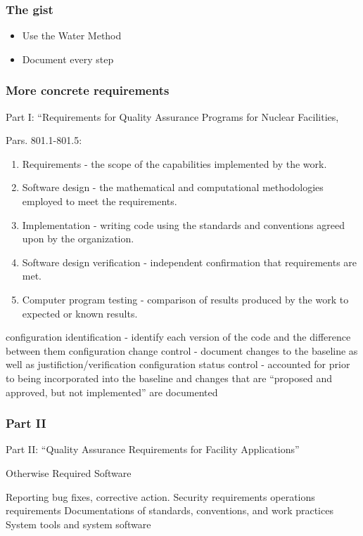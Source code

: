 \documentclass[12pt]{beamer}
\begin{document}
\begin{frame}
\frametitle{The gist}

\begin{itemize}
\item{Use the Water Method}
\item{Document every step}
\end{itemize}

\end{frame}

\begin{frame}
\frametitle{More concrete requirements}

Part I: “Requirements for Quality Assurance Programs for
Nuclear Facilities,

Pars. 801.1-801.5:
\begin{enumerate}
\item{Requirements - the scope of the capabilities implemented by the work.}
\item{Software design - the mathematical and computational methodologies employed to meet the requirements.}
\item{Implementation - writing code using the standards and conventions agreed upon by the organization.}
\item{Software design verification - independent confirmation that requirements are met.}
\item{Computer program testing - comparison of results produced by the work to expected or known results.}
\end{enumerate}

configuration identification - identify each version of the code and the difference between them
configuration change control - document changes to the baseline as well as justifiction/verification
configuration status control - accounted for prior to being incorporated into the baseline and changes that are “proposed and approved, but not implemented” are documented \cite{add}

\end{frame}

\begin{frame}
\frametitle{Part II}
Part II: “Quality Assurance Requirements for Facility Applications”

Otherwise Required Software

Reporting bug fixes, corrective action.
Security requirements
operations requirements
Documentations of standards, conventions, and work practices
System tools and system software


\end{frame}
\end{document}
